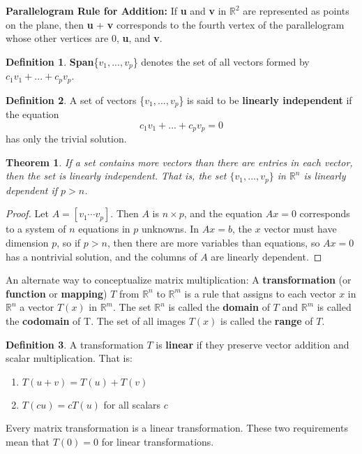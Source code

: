 \documentclass[letterpaper]{article}
\newtheorem{theorem}{Theorem}
\theoremstyle{definition}
\newtheorem{definition}{Definition}[section]
\begin{document}
\textbf{Parallelogram Rule for Addition:} If \textbf{u} and \textbf{v} in $\mathbb{R}^2$ are represented as points on the plane, then \textbf{u} + \textbf{v} corresponds to the fourth vertex of the parallelogram whose other vertices are 0, \textbf{u}, and \textbf{v}. 

\begin{definition}
\textbf{Span}\{$v_1, ..., v_p$\} denotes the set of all vectors formed by $c_1 v_1 + ... + c_p v_p$. 
\end{definition}

\begin{definition}
A set of vectors \{$v_1, ..., v_p$\} is said to be \textbf{linearly independent} if the equation 
$$c_1 v_1 + ... + c_p v_p = 0$$ 
has only the trivial solution. 
\end{definition}

\begin{theorem}
If a set contains more vectors than there are entries in each vector, then the set is linearly independent. That is, the set $\{v_1, ..., v_p\}$ in $\mathbb{R}^n$ is linearly dependent if $p > n$. 
\end{theorem}

\begin{proof}
Let $A = [v_1 \cdots v_p]$. Then $A$ is $n \times p$, and the equation $Ax = 0$ corresponds to a system of $n$ equations in $p$ unknowns. In $Ax = b$, the $x$ vector must have dimension $p$, so if $p>n$, then there are more variables than equations, so $Ax = 0$ has a nontrivial solution, and the columns of $A$ are linearly dependent. 
\end{proof}

An alternate way to conceptualize matrix multiplication: A \textbf{transformation} (or \textbf{function} or \textbf{mapping}) $T$ from $\mathbb{R}^n$ to $\mathbb{R}^m$ is a rule that assigns to each vector $x$ in $\mathbb{R}^n$ a vector $T(x)$ in $\mathbb{R}^m$. The set $\mathbb{R}^n$ is called the \textbf{domain} of $T$ and $\mathbb{R}^m$ is called the \textbf{codomain} of T. The set of all images $T(x)$ is called the \textbf{range} of $T$. 

\begin{definition} 
A transformation $T$ is \textbf{linear} if they preserve vector addition and scalar multiplication. That is:
\begin{enumerate}
	\item $T(u + v) = T(u) + T(v)$
	\item $T(cu) = cT(u)$ for all scalars $c$
\end{enumerate}
Every matrix transformation is a linear transformation. These two requirements mean that $T(0) = 0$ for linear transformations. 
\end{definition}
\end{document}
